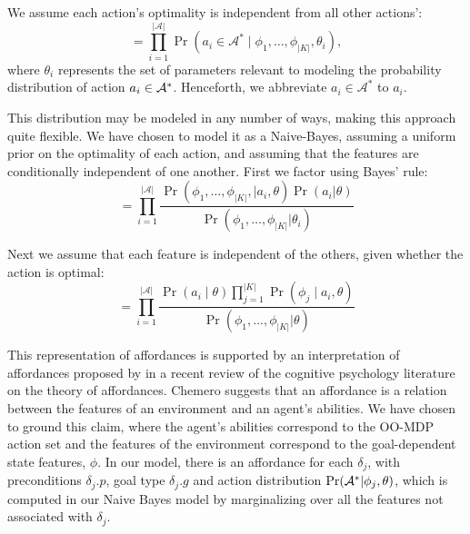 \documentclass[conference]{IEEEtran}
\newcommand{\jnote}[1]{\textcolor{Orange}{\textbf{}}}
\begin{document}
We assume each action's optimality is independent from all other actions':
\begin{equation}
= \prod_{i=1}^{|\mathcal{A}|} \Pr(a_i \in \mathcal{A}^* \mid \phi_1, \ldots, \phi_{|K|}, \theta_i),
\label{eq:action_independ}
\end{equation}
where $\theta_i$ represents the set of parameters relevant to modeling the probability distribution of action $a_i \in {\cal A}^*$. Henceforth, we abbreviate $a_i \in \mathcal{A}^*$ to $a_i$.

This distribution may be modeled in any number of ways, making this approach quite flexible.
We have chosen to model it as a Naive-Bayes, assuming a uniform prior
on the optimality of each action, and assuming that the features are
conditionally independent of one another.  First we factor using Bayes' rule:
\begin{equation}
= \prod_{i=1}^{|\mathcal{A}|} \frac{\Pr(\phi_1, \ldots, \phi_{|K|}, \mid a_i, \theta) \Pr(a_i | \theta)}{\Pr(\phi_1, \ldots, \phi_{|K|} | \theta_i)}
\label{eq:bayes}
\end{equation}

Next we assume that each feature is independent of the others, given
whether the action is optimal:
\begin{equation}
= \prod_{i=1}^{|\mathcal{A}|} \frac{\Pr(a_i \mid \theta) \prod_{j=1}^{|K|} \Pr(\phi_j \mid a_i, \theta) }{\Pr(\phi_1, \ldots, \phi_{|K|} | \theta)}
\label{eq:final}
\end{equation}
\jnote{I'm somewhat inclined to not write down the Naive Bayes derivation and just say ``We have chosen a Naive-Bayes model which treats each feature as indepdent of each other given whether the action was optimal or not''}

This representation of affordances is supported by an interpretation of affordances proposed by \citet{chemero2003} in a recent review of the cognitive psychology literature on the theory of affordances. Chemero suggests that an affordance is a relation between the features of an environment and an agent's abilities. We have chosen to ground this claim, where
the agent's abilities correspond to the OO-MDP action set and the features of the environment correspond
to the goal-dependent state features, $\phi$. In our model, there is an affordance for each $\delta_j$, with preconditions $\delta_j.p$, goal type $\delta_j.g$ and action distribution $\Pr({\cal A}^* | \phi_j, \theta)$, which is computed in our Naive Bayes model by marginalizing over all the features not associated with $\delta_j$.
\end{document}
